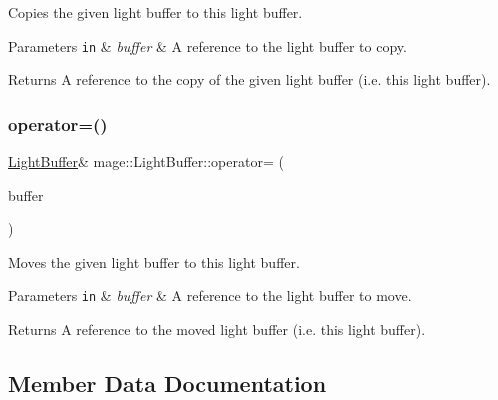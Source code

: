 Copies the given light buffer to this light buffer.


\begin{DoxyParams}[1]{Parameters}
\mbox{\tt in}  & {\em buffer} & A reference to the light buffer to copy. \\
\hline
\end{DoxyParams}
\begin{DoxyReturn}{Returns}
A reference to the copy of the given light buffer (i.\+e. this light buffer). 
\end{DoxyReturn}
\hypertarget{structmage_1_1_light_buffer_a7a41e25c173b24a643e6a82a382c3c35}{}\label{structmage_1_1_light_buffer_a7a41e25c173b24a643e6a82a382c3c35} 
\subsubsection{\texorpdfstring{operator=()}{operator=()}\hspace{0.1cm}{\footnotesize\ttfamily [2/2]}}
{\footnotesize\ttfamily \hyperlink{structmage_1_1_light_buffer}{Light\+Buffer}\& mage\+::\+Light\+Buffer\+::operator= (\begin{DoxyParamCaption}\item[{\hyperlink{structmage_1_1_light_buffer}{Light\+Buffer} \&\&}]{buffer }\end{DoxyParamCaption})\hspace{0.3cm}{\ttfamily [default]}}

Moves the given light buffer to this light buffer.


\begin{DoxyParams}[1]{Parameters}
\mbox{\tt in}  & {\em buffer} & A reference to the light buffer to move. \\
\hline
\end{DoxyParams}
\begin{DoxyReturn}{Returns}
A reference to the moved light buffer (i.\+e. this light buffer). 
\end{DoxyReturn}


\subsection{Member Data Documentation}
\hypertarget{structmage_1_1_light_buffer_adc1532cb0ba1a9f8b87bdacc10df2a8d}{}\label{structmage_1_1_light_buffer_adc1532cb0ba1a9f8b87bdacc10df2a8d} 
